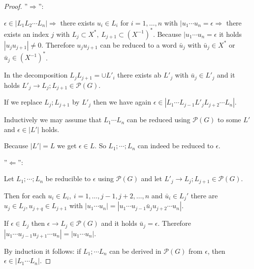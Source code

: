 \begin{proof}

''$\Rightarrow$'':

$\epsilon \in |L_1 L_2 \cdots L_n| \Rightarrow$ there exists $u_i \in L_i$ for
$i = 1, \ldots, n$ with $|u_1 \cdots u_n = \epsilon \Rightarrow$ there exists an
index $j$ with $L_j \subset X^*,\ L_{j+1} \subset (X^{-1})^*$. Because $|u_1
\cdots u_n = \epsilon$ it holds $|u_j u_{j+1}| \neq 0$. Therefore $u_j u_{j+1}$
can be reduced to a word $\bar{u}_j$ with $\bar{u}_j \in X^*$ or $\bar{u}_j \in
(X^{-1})^*$.

In the decomposition $L_j L_{j+1} = \cup L'_i$ there exists ab $L'_j$ with
$\bar{u}_j \in L'_j$ and it holds $L'_j \to L_j;L_{j+1} \in \mathcal{P}(G)$.

If we replace $L_j;L_{j+1}$ by $L'_j$ then we have again $\epsilon \in |L_1
\cdots L_{j-1} L'_j L_{j+2} \cdots L_n|$.

Inductively we may assume that $L_1 \cdots L_n$ can be reduced using
$\mathcal{P}(G)$ to some $L'$ and $\epsilon \in |L'|$ holds.

Because $|L'| = L$ we get $\epsilon \in L$. So $L_1;\cdots;L_n$ can indeed be
reduced to $\epsilon$.

''$\Leftarrow$'':

Let $L_1;\cdots;L_n$ be reducible to $\epsilon$ using $\mathcal{P}(G)$ and let
$L'_j \to L_j;L_{j+1} \in \mathcal{P}(G)$.

Then for each $u_i \in L_i,\ i = 1,\ldots,j-1,j+2,\ldots,n$ and $\bar{u}_i \in
L_j'$ there are $u_j \in L_j, u_{j+q} \in L_{j+1}$ with $|u_1 \cdots u_n| =
|u_1 \cdots u_{j-1}\bar{u}_j u_{j+2} \cdots u_n|$.

If $\epsilon \in L_j$ then $\epsilon \to L_j \in \mathcal{P}(G)$ and it holds
$\bar{u}_j = \epsilon$. Therefore $|u_1 \cdots u_{j-1} u_{j+1} \cdots u_n| =
|u_1 \cdots u_n|$.

By induction it follows: if $L_1; \cdots L_n$ can be derived in
$\mathcal{P}(G)$ from $\epsilon$, then $\epsilon \in |L_1 \cdots L_n|$.
\end{proof}

